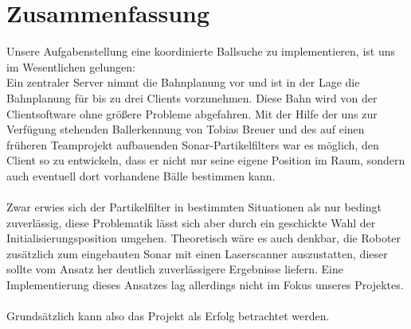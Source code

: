 
\chapter{Zusammenfassung}
\label{cha:zusammenfassung}
Unsere Aufgabenstellung eine koordinierte Ballsuche 
zu implementieren, ist uns im Wesentlichen gelungen:\\
Ein zentraler Server nimmt die Bahnplanung vor und ist in der Lage die
Bahnplanung für bis zu drei Clients vorzunehmen. Diese Bahn wird von
der Clientsoftware ohne größere Probleme abgefahren. Mit der Hilfe der
uns zur Verfügung stehenden Ballerkennung von Tobias Breuer und des
auf einen früheren Teamprojekt aufbauenden Sonar-Partikelfilters war
es möglich, den Client so zu
entwickeln, dass er nicht nur seine eigene Position im Raum, sondern
auch eventuell dort vorhandene Bälle bestimmen kann. \\\\
Zwar erwies sich der Partikelfilter in bestimmten Situationen als nur
bedingt zuverlässig, diese Problematik lässt sich aber durch ein
geschickte Wahl der Initialisierungsposition umgehen. Theoretisch wäre
es auch denkbar, die Roboter zusätzlich zum eingebauten Sonar mit
einen Laserscanner auszustatten, dieser sollte vom Ansatz her deutlich
zuverlässigere Ergebnisse liefern. Eine Implementierung dieses
Ansatzes lag allerdings nicht im Fokus unseres Projektes. \\\\
Grundsätzlich kann also das Projekt als Erfolg betrachtet werden.
